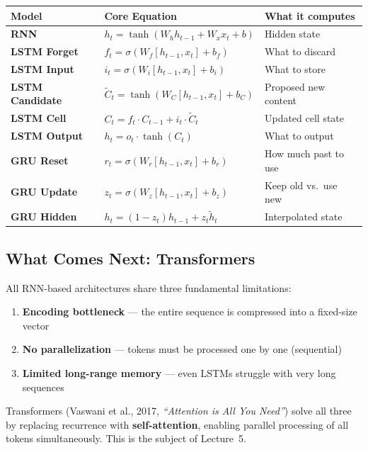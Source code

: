 \documentclass[11pt,a4paper]{article}
\begin{document}
\begin{center}
\renewcommand{\arraystretch}{1.5}
\begin{tabular}{@{}p{3cm}p{7cm}p{4.5cm}@{}}
\toprule
\textbf{Model} & \textbf{Core Equation} & \textbf{What it computes} \\
\midrule
\textbf{RNN} & $h_t = \tanh(W_h h_{t-1} + W_x x_t + b)$ & Hidden state \\
\textbf{LSTM Forget} & $f_t = \sigma(W_f [h_{t-1}, x_t] + b_f)$ & What to discard \\
\textbf{LSTM Input} & $i_t = \sigma(W_i [h_{t-1}, x_t] + b_i)$ & What to store \\
\textbf{LSTM Candidate} & $\tilde{C}_t = \tanh(W_C [h_{t-1}, x_t] + b_C)$ & Proposed new content \\
\textbf{LSTM Cell} & $C_t = f_t \cdot C_{t-1} + i_t \cdot \tilde{C}_t$ & Updated cell state \\
\textbf{LSTM Output} & $h_t = o_t \cdot \tanh(C_t)$ & What to output \\
\textbf{GRU Reset} & $r_t = \sigma(W_r [h_{t-1}, x_t] + b_r)$ & How much past to use \\
\textbf{GRU Update} & $z_t = \sigma(W_z [h_{t-1}, x_t] + b_z)$ & Keep old vs.\ use new \\
\textbf{GRU Hidden} & $h_t = (1{-}z_t) h_{t-1} + z_t \tilde{h}_t$ & Interpolated state \\
\bottomrule
\end{tabular}
\end{center}

\subsection{What Comes Next: Transformers}

All RNN-based architectures share three fundamental limitations:

\begin{enumerate}[leftmargin=1.5em]
    \item \textbf{Encoding bottleneck} --- the entire sequence is compressed into a fixed-size vector
    \item \textbf{No parallelization} --- tokens must be processed one by one (sequential)
    \item \textbf{Limited long-range memory} --- even LSTMs struggle with very long sequences
\end{enumerate}

Transformers (Vaswani et al., 2017, \textit{``Attention is All You Need''}) solve all three by replacing recurrence with \textbf{self-attention}, enabling parallel processing of all tokens simultaneously. This is the subject of Lecture~5.
\end{document}
